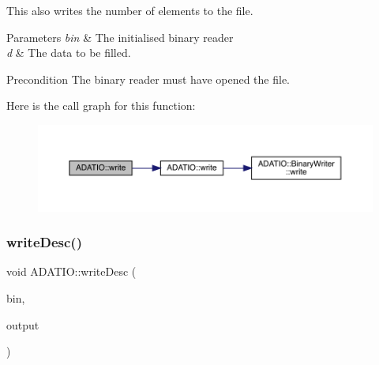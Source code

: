 This also writes the number of elements to the file. 
\begin{DoxyParams}{Parameters}
{\em bin} & The initialised binary reader \\
\hline
{\em d} & The data to be filled.\\
\hline
\end{DoxyParams}
\begin{DoxyPrecond}{Precondition}
The binary reader must have opened the file. 
\end{DoxyPrecond}
Here is the call graph for this function\+:\nopagebreak
\begin{figure}[H]
\begin{center}
\leavevmode
\includegraphics[width=350pt]{d0/dba/namespaceADATIO_a29572ec079e7257de618b505e0baee59_cgraph}
\end{center}
\end{figure}
\mbox{\label{namespaceADATIO_a0faeed900aacb29febaa709323135c50}} 
\subsubsection{\texorpdfstring{writeDesc()}{writeDesc()}}
{\footnotesize\ttfamily void A\+D\+A\+T\+I\+O\+::write\+Desc (\begin{DoxyParamCaption}\item[{\mbox{\hyperlink{classADATIO_1_1BinaryWriter}{Binary\+Writer}} \&}]{bin,  }\item[{const std\+::string \&}]{output }\end{DoxyParamCaption})}

